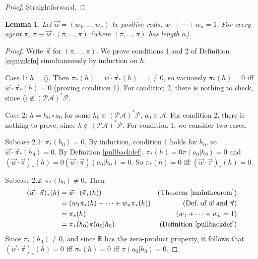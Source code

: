 \documentclass{article}
\newtheorem{lemma}[theorem]{Lemma}
\begin{document}
\begin{proof}
    Straightforward.
\end{proof}

\begin{lemma}
\label{piopluspilemma}
    Let $\vec w=(w_1,\ldots,w_n)$ be positive reals,
    $w_1+\cdots+w_n=1$. For every agent $\pi$,
    $\pi\equiv\vec w\cdot (\pi,\ldots,\pi)$ (where
    $(\pi,\ldots,\pi)$ has length $n$).
\end{lemma}

\begin{proof}
    Write $\vec\pi$ for $(\pi,\ldots,\pi)$.
    We prove conditions 1 and 2 of Definition \ref{equivdefn}
    simultaneously by induction on $h$.
 
    Case 1: $h=\langle\rangle$. Then
    $\pi_*(h)=\vec w\cdot\vec\pi_*(h)=1\not=0$, so
    vacuously $\pi_*(h)=0$ iff $\vec w\cdot\vec\pi_*(h)=0$
    (proving condition 1).
    For condition 2, there is nothing to check, since
    $\langle\rangle\not\in(\mathcal P\mathcal A)^*\mathcal P$.

    Case 2: $h=h_0\circ a_0$ for some
        $h_0\in(\mathcal P\mathcal A)^*\mathcal P$, $a_0\in\mathcal A$.
        For condition 2, there is nothing to prove, since
        $h\not\in(\mathcal P\mathcal A)^*\mathcal P$.
        For condition 1, we consider two cases.

        Subcase 2.1: $\pi_*(h_0)=0$.
        By induction, condition 1 holds for $h_0$, so
        $\vec w\cdot\vec\pi_*(h_0)=0$.
        By Definition \ref{pullbackdef},
        $\pi_*(h)=0\pi(a_0|h_0)=0$
        and $(\vec w\cdot\vec\pi)_*(h)=0(\vec w\cdot\vec\pi)(a_0|h_0)=0$.
        So $\pi_*(h)=0$ iff $(\vec w\cdot\vec\pi)_*(h)=0$.

        Subcase 2.2: $\pi_*(h_0)\not=0$.
        Then
        \begin{align*}
            (\vec w\cdot \vec\pi)_*(h)
                &= \vec w\cdot(\vec\pi_*(h))
                    &\mbox{(Theorem \ref{maintheorem})}\\
                &= (w_1\pi_*(h)+\cdots+w_n\pi_*(h))
                    &\mbox{(Def.\ of $\vec w$ and $\vec\pi$)}\\
                &= \pi_*(h)
                    &\mbox{($w_1+\cdots+w_n=1$)}\\
                &= \pi_*(h_0)\pi(a_0|h_0).
                    &\mbox{(Definition \ref{pullbackdef})}
        \end{align*}
        Since $\pi_*(h_0)\not=0$, and since $\mathbb R$ has the zero-product property,
        it follows that
        $(\vec w\cdot\vec\pi)_*(h)=0$ iff $\pi_*(h)=0$ iff $\pi(a_0|h_0)=0$.


\end{proof}
\end{document}
